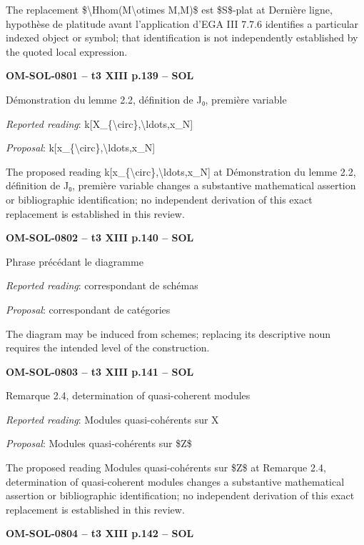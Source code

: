 The replacement \$\textbackslash{}Hhom(M\textbackslash{}otimes M,M)\$ est \$S\$-plat at Dernière ligne, hypothèse de platitude avant l'application d'EGA III 7.7.6 identifies a particular indexed object or symbol; that identification is not independently established by the quoted local expression.\par
\par\noindent\textbf{OM-SOL-0801 -- t3 XIII p.139 -- SOL}\par
Démonstration du lemme 2.2, définition de J₀, première variable\par
\emph{Reported reading}: k[X\_\{\textbackslash{}circ\},\textbackslash{}ldots,x\_N]\par
\emph{Proposal}: k[x\_\{\textbackslash{}circ\},\textbackslash{}ldots,x\_N]\par
The proposed reading k[x\_\{\textbackslash{}circ\},\textbackslash{}ldots,x\_N] at Démonstration du lemme 2.2, définition de J₀, première variable changes a substantive mathematical assertion or bibliographic identification; no independent derivation of this exact replacement is established in this review.\par
\par\noindent\textbf{OM-SOL-0802 -- t3 XIII p.140 -- SOL}\par
Phrase précédant le diagramme\par
\emph{Reported reading}: correspondant de schémas\par
\emph{Proposal}: correspondant de catégories\par
The diagram may be induced from schemes; replacing its descriptive noun requires the intended level of the construction.\par
\par\noindent\textbf{OM-SOL-0803 -- t3 XIII p.141 -- SOL}\par
Remarque 2.4, determination of quasi-coherent modules\par
\emph{Reported reading}: Modules quasi-cohérents sur X\par
\emph{Proposal}: Modules quasi-cohérents sur \$Z\$\par
The proposed reading Modules quasi-cohérents sur \$Z\$ at Remarque 2.4, determination of quasi-coherent modules changes a substantive mathematical assertion or bibliographic identification; no independent derivation of this exact replacement is established in this review.\par
\par\noindent\textbf{OM-SOL-0804 -- t3 XIII p.142 -- SOL}\par
